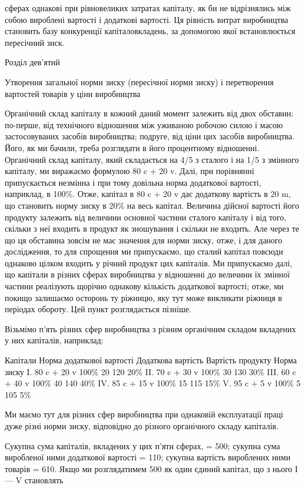 сферах однакові при рівновеликих затратах капіталу, як би не
відрізнялись між собою вироблені вартості і додаткові вартості.
Ця рівність витрат виробництва становить базу конкуренції капіталовкладень, за допомогою якої
встановлюється пересічний зиск.

Розділ дев’ятий

Утворення загальної норми зиску (пересічної норми зиску) і перетворення вартостей товарів у ціни
виробництва

Органічний склад капіталу в кожний даний момент залежить
від двох обставин: по-перше, від технічного відношення між уживаною робочою силою і масою
застосовуваних засобів виробництва; подруге, від ціни цих засобів виробництва. Його, як ми бачили,
треба розглядати в його процентному відношенні. Органічний склад капіталу, який складається на 4/5 з
сталого і на 1/5 з змінного капіталу, ми виражаємо формулою 80 c + 20 v. Далі, при
порівнянні припускається незмінна і при тому довільна норма
додаткової вартості, наприклад, в 100\%. Отже, капітал в 80 c + 20 v дає додаткову вартість в 20 m,
що становить норму зиску
в 20\% на весь капітал. Величина дійсної вартості його продукту
залежить від величини основної частини сталого капіталу і від
того, скільки з неї входить в продукт як зношування і скільки
не входить. Але через те що ця обставина зовсім не має значення для норми зиску, отже, і для даного
дослідження, то для
спрощення ми припускаємо, що сталий капітал повсюди однаково цілком входить у річний продукт цих
капіталів. Ми припускаємо далі, що капітали в різних сферах виробництва у
відношенні до величини їх змінної частини реалізують щорічно
однакову кількість додаткової вартості; отже, ми покищо залишаємо осторонь ту ріжницю, яку тут може
викликати ріжниця
в періодах обороту. Цей пункт розглядається пізніше.

Візьмімо п’ять різних сфер виробництва з різним органічним
складом вкладених у них капіталів, наприклад:

Капітали    Норма додаткової вартості    Додаткова  вартість    Вартість продукту   Норма  зиску
І. 80 c + 20 v    100\%    20    120    20\%
II. 70 c + 30 v   100\%    30    130    30\%
III. 60 c + 40 v   100\%    40   140    40\%
IV. 85 c + 15 v   100\%    15    115    15\%
V. 95 c + 5 v     100\%    5    105    5\%

Ми маємо тут для різних сфер виробництва при однаковій
експлуатації праці дуже різні норми зиску, відповідно до різного органічного складу капіталів.

Сукупна сума капіталів, вкладених у цих п’яти сферах, = 500;
сукупна сума виробленої ними додаткової вартості = 110; сукупна вартість вироблених ними товарів =
610. Якщо ми розглядатимем 500 як один єдиний капітал, що з нього І — V становлять
